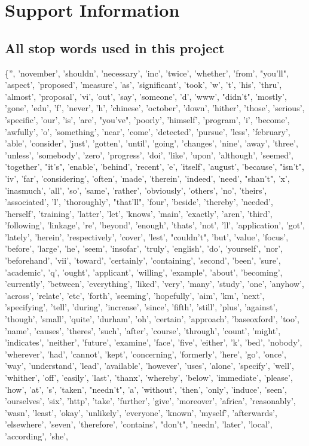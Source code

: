 \newpage

\section*{Support Information}

\subsection*{All stop words used in this project}

\{'', 'november', 'shouldn', 'necessary', 'inc', 'twice', 'whether', 'from', "you'll", 'aspect', 'proposed', 'measure', 'as', 'significant', 'took', 'w', 't', 'his', 'thru', 'almost', 'proposal', 'vi', 'out', 'say', 'someone', 'd', 'www', "didn't", 'mostly', 'gone', 'edu', 'f', 'never', 'h', 'chinese', 'october', 'down', 'hither', 'those', 'serious', 'specific', 'our', 'is', 'are', "you've", 'poorly', 'himself', 'program', 'i', 'become', 'awfully', 'o', 'something', 'near', 'come', 'detected', 'pursue', 'less', 'february', 'able', 'consider', 'just', 'gotten', 'until', 'going', 'changes', 'nine', 'away', 'three', 'unless', 'somebody', 'zero', 'progress', 'doi', 'like', 'upon', 'although', 'seemed', 'together', "it's", 'enable', 'behind', 'recent', 'e', 'itself', 'august', 'because', "isn't", 'iv', 'far', 'considering', 'often', 'made', 'therein', 'indeed', 'need', "shan't", 'x', 'inasmuch', 'all', 'so', 'same', 'rather', 'obviously', 'others', 'no', 'theirs', 'associated', 'l', 'thoroughly', "that'll", 'four', 'beside', 'thereby', 'needed', 'herself', 'training', 'latter', 'let', 'knows', 'main', 'exactly', 'aren', 'third', 'following', 'linkage', 're', 'beyond', 'enough', 'thats', 'not', 'll', 'application', 'got', 'lately', 'herein', 'respectively', 'cover', 'lest', "couldn't", 'but', 'value', 'focus', 'before', 'large', 'he', 'seem', 'insofar', 'truly', 'english', 'do', 'yourself', 'nor', 'beforehand', 'vii', 'toward', 'certainly', 'containing', 'second', 'been', 'sure', 'academic', 'q', 'ought', 'applicant', 'willing', 'example', 'about', 'becoming', 'currently', 'between', 'everything', 'liked', 'very', 'many', 'study', 'one', 'anyhow', 'across', 'relate', 'etc', 'forth', 'seeming', 'hopefully', 'aim', 'km', 'next', 'specifying', 'tell', 'during', 'increase', 'since', 'fifth', 'still', 'plus', 'against', 'though', 'small', 'quite', 'durham', 'oh', 'certain', 'approach', 'baseoxford', 'too', 'name', 'causes', 'theres', 'such', 'after', 'course', 'through', 'count', 'might', 'indicates', 'neither', 'future', 'examine', 'face', 'five', 'either', 'k', 'bed', 'nobody', 'wherever', 'had', 'cannot', 'kept', 'concerning', 'formerly', 'here', 'go', 'once', 'way', 'understand', 'lead', 'available', 'however', 'uses', 'alone', 'specify', 'well', 'whither', 'off', 'easily', 'last', 'thanx', 'whereby', 'below', 'immediate', 'please', 'how', 'at', 's', 'taken', "needn't", 'a', 'without', 'then', 'only', 'induce', 'seen', 'ourselves', 'six', 'http', 'take', 'further', 'give', 'moreover', 'africa', 'reasonably', 'wasn', 'least', 'okay', 'unlikely', 'everyone', 'known', 'myself', 'afterwards', 'elsewhere', 'seven', 'therefore', 'contains', "don't", 'needn', 'later', 'local', 'according', 'she', 